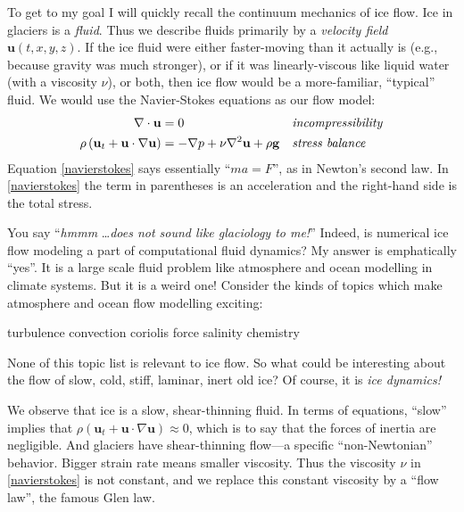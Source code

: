 \documentclass[titlepage,letterpaper,final,12pt]{scrartcl}
\begin{document}
To get to my goal I will quickly recall the continuum mechanics of ice flow.  Ice in glaciers is a \emph{fluid}.  Thus we describe fluids primarily by a \emph{velocity field} $\mathbf{u}(t,x,y,z)$.  If the ice fluid were either faster-moving than it actually is (e.g., because gravity was much stronger), or if it was linearly-viscous like liquid water (with a viscosity $\nu$), or both, then ice flow would be a more-familiar, ``typical'' fluid.  We would use the Navier-Stokes equations as our flow model:
\begin{align}
\nabla \cdot \mathbf{u} &= 0 &&\text{\emph{incompressibility}} \label{incompressible} \\
\rho \left(\mathbf{u}_t + \mathbf{u}\cdot\nabla \mathbf{u}\right) &= -\nabla p + \nu \nabla^2 \mathbf{u} + \rho \mathbf{g} &&\text{\emph{stress balance}} \label{navierstokes}
\end{align}
Equation \eqref{navierstokes} says essentially ``$ma=F$'', as in Newton's second law.  In \eqref{navierstokes} the term in parentheses is an acceleration and the right-hand side is the total stress.

You say ``\emph{hmmm} \dots \emph{does not sound like glaciology to me!}''  Indeed, is numerical ice flow modeling a part of computational fluid dynamics?  My answer is emphatically ``yes''.  It is a large scale fluid problem like atmosphere and ocean modelling in climate systems.  But it is a weird one!  Consider the kinds of topics which make atmosphere and ocean flow modelling exciting:
  \begin{center} turbulence \qquad convection \qquad  coriolis force  \qquad salinity \qquad chemistry
  \end{center}
None of this topic list is relevant to ice flow.  So what could be interesting about the flow of slow, cold, stiff, laminar, inert old ice?  Of course, it is \emph{ice dynamics!}

We observe that ice is a slow, shear-thinning fluid.  In terms of equations, ``slow'' implies that $\rho \left(\mathbf{u}_t + \mathbf{u}\cdot\nabla \mathbf{u}\right) \approx 0$, which is to say that the forces of inertia are negligible.  And glaciers have shear-thinning flow---a specific ``non-Newtonian'' behavior.  Bigger strain rate means smaller viscosity.  Thus the viscosity $\nu$ in \eqref{navierstokes} is not constant, and we replace this constant viscosity by a ``flow law'', the famous Glen law.
\end{document}
